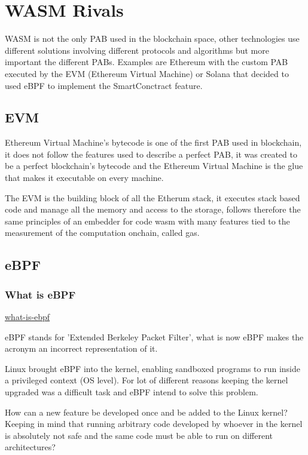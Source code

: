 \documentclass[../main.tex]{subfiles}
\begin{document}
\section{WASM Rivals}

WASM is not the only PAB used in the blockchain space, other technologies use different solutions involving different protocols and algorithms but more important the different PABs. Examples are Ethereum with the custom PAB executed by the EVM (Ethereum Virtual Machine) or Solana that decided to used eBPF to implement the SmartConctract feature.

\subsection{EVM}

Ethereum Virtual Machine's bytecode is one of the first PAB used in blockchain, it does not follow the features used to describe a perfect PAB, it was created to be a perfect blockchain's bytecode and the Ethereum Virtual Machine is the glue that makes it executable on every machine.

The EVM is the building block of all the Etherum stack, it executes stack based code and manage all the memory and access to the storage, follows therefore the same principles of an embedder for code wasm with many features tied to the measurement of the computation onchain, called gas.

\subsection{eBPF}

\subsubsection{What is eBPF}

\href{https://ebpf.io/what-is-ebpf/}{what-is-ebpf}

eBPF stands for 'Extended Berkeley Packet Filter', what is now eBPF makes the acronym an incorrect representation of it.

Linux brought eBPF into the kernel, enabling sandboxed programs to run inside a privileged context (OS level). For lot of different reasons keeping the kernel upgraded was a difficult task and eBPF intend to solve this problem.

How can a new feature be developed once and be added to the Linux kernel? Keeping in mind that running arbitrary code developed by whoever in the kernel is absolutely not safe and the same code must be able to run on different architectures?
\end{document}
